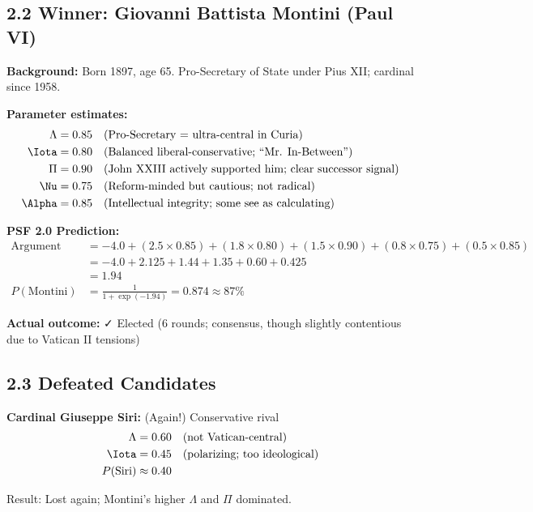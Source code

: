 \subsection{2.2 Winner: Giovanni Battista Montini (Paul VI)}

\textbf{Background:} Born 1897, age 65. Pro-Secretary of State under Pius XII; cardinal since 1958.

\textbf{Parameter estimates:}
\begin{align*}
\Lambda &= 0.85 \quad \text{(Pro-Secretary = ultra-central in Curia)} \\
\Iota &= 0.80 \quad \text{(Balanced liberal-conservative; ``Mr. In-Between'')} \\
\Pi &= 0.90 \quad \text{(John XXIII actively supported him; clear successor signal)} \\
\Nu &= 0.75 \quad \text{(Reform-minded but cautious; not radical)} \\
\Alpha &= 0.85 \quad \text{(Intellectual integrity; some see as calculating)}
\end{align*}

\textbf{PSF 2.0 Prediction:}
\begin{align*}
\text{Argument} &= -4.0 + (2.5 \times 0.85) + (1.8 \times 0.80) + (1.5 \times 0.90) + (0.8 \times 0.75) + (0.5 \times 0.85) \\
&= -4.0 + 2.125 + 1.44 + 1.35 + 0.60 + 0.425 \\
&= 1.94 \\
P(\text{Montini}) &= \frac{1}{1 + \exp(-1.94)} = 0.874 \approx 87\%
\end{align*}

\textbf{Actual outcome:} ✓ Elected (6 rounds; consensus, though slightly contentious due to Vatican II tensions)

\subsection{2.3 Defeated Candidates}

\textbf{Cardinal Giuseppe Siri:} (Again!) Conservative rival
\begin{align*}
\Lambda &= 0.60 \quad \text{(not Vatican-central)} \\
\Iota &= 0.45 \quad \text{(polarizing; too ideological)} \\
P(\text{Siri}) &\approx 0.40
\end{align*}

Result: Lost again; Montini's higher $\Lambda$ and $\Pi$ dominated.

